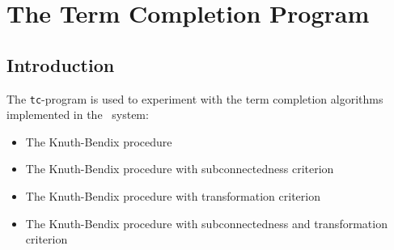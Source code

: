 \section{The Term Completion Program}
\subsection{Introduction}
The {\tt tc}-program is used to experiment with the term completion algorithms
\cite{KnuthBendix:67}
implemented in the \redux\ system:

\begin{itemize}
\item The Knuth-Bendix procedure
\item The Knuth-Bendix procedure with subconnectedness criterion
\item The Knuth-Bendix procedure with transformation criterion
\item The Knuth-Bendix procedure with subconnectedness and
transformation criterion
\end{itemize}

